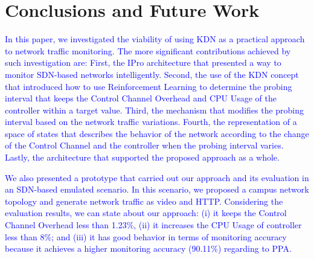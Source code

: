 \section{Conclusions and Future Work}
\textcolor{blue}{In this paper, we investigated the viability of using KDN as a practical approach to network traffic monitoring. The more significant contributions achieved by such investigation are: First, the IPro architecture that presented a way to monitor SDN-based networks intelligently. Second, the use of the KDN concept that introduced how to use Reinforcement Learning to determine the probing interval that keeps the Control Channel Overhead and CPU Usage of the controller within a target value. Third, the mechanism that modifies the probing interval based on the network traffic variations. Fourth, the representation of a space of states that describes the behavior of the network according to the change of the Control Channel and the controller when the probing interval varies. Lastly, the architecture that supported the proposed approach as a whole.}

\textcolor{blue}{We also presented a prototype that carried out our approach and its evaluation in an SDN-based emulated scenario. In this scenario, we proposed a campus network topology and generate network traffic as video and HTTP. Considering the evaluation results, we can state about our approach: (i) it keeps the Control Channel Overhead less than 1.23\%, (ii) it increases the CPU Usage of controller less than 8\%; and (iii) it has good behavior in terms of monitoring accuracy because it achieves a higher monitoring accuracy (90.11\%) regarding to PPA.}



